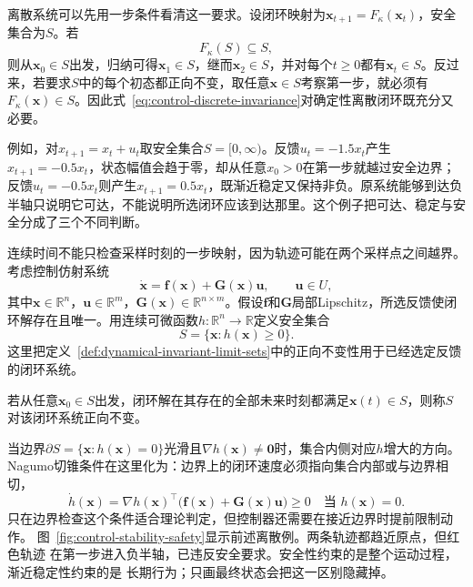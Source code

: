离散系统可以先用一步条件看清这一要求。设闭环映射为$\bm{x}_{t+1}=F_{\kappa}(\bm{x}_t)$，安全集合为$S$。若
\begin{equation}
  F_{\kappa}(S)\subseteq S,
  \label{eq:control-discrete-invariance}
\end{equation}
则从$\bm{x}_0\in S$出发，归纳可得$\bm{x}_1\in S$，继而$\bm{x}_2\in S$，并对每个$t\geq0$都有$\bm{x}_t\in S$。反过来，若要求$S$中的每个初态都正向不变，取任意$\bm{x}\in S$考察第一步，就必须有$F_{\kappa}(\bm{x})\in S$。因此式~\eqref{eq:control-discrete-invariance}对确定性离散闭环既充分又必要。

例如，对$x_{t+1}=x_t+u_t$取安全集合$S=[0,\infty)$。反馈$u_t=-1.5x_t$产生$x_{t+1}=-0.5x_t$，状态幅值会趋于零，却从任意$x_0>0$在第一步就越过安全边界；反馈$u_t=-0.5x_t$则产生$x_{t+1}=0.5x_t$，既渐近稳定又保持非负。原系统能够到达负半轴只说明它可达，不能说明所选闭环应该到达那里。这个例子把可达、稳定与安全分成了三个不同判断。

连续时间不能只检查采样时刻的一步映射，因为轨迹可能在两个采样点之间越界。考虑控制仿射系统
\begin{equation}
  \dot{\bm{x}}
  =
  \bm{f}(\bm{x})+\bm{G}(\bm{x})\bm{u},
  \qquad
  \bm{u}\in U,
  \label{eq:control-affine-system}
\end{equation}
其中$\bm{x}\in\mathbb{R}^n$，$\bm{u}\in\mathbb{R}^m$，$\bm{G}(\bm{x})\in\mathbb{R}^{n\times m}$。假设$\bm{f}$和$\bm{G}$局部Lipschitz，所选反馈使闭环解存在且唯一。用连续可微函数$h:\mathbb{R}^n\to\mathbb{R}$定义安全集合
\begin{equation}
  S
  =
  \{\bm{x}:h(\bm{x})\geq0\}.
  \label{eq:control-safe-set}
\end{equation}
这里把定义~\ref{def:dynamical-invariant-limit-sets}中的正向不变性用于已经选定反馈的闭环系统。
\begin{definition}[正向不变集]
\label{def:control-forward-invariance}
若从任意$\bm{x}_0\in S$出发，闭环解在其存在的全部未来时刻都满足$\bm{x}(t)\in S$，则称$S$对该闭环系统正向不变。
\end{definition}
当边界$\partial S=\{\bm{x}:h(\bm{x})=0\}$光滑且$\nabla h(\bm{x})\neq\bm{0}$时，集合内侧对应$h$增大的方向。Nagumo切锥条件在这里化为：边界上的闭环速度必须指向集合内部或与边界相切，
\begin{equation}
  \dot h(\bm{x})
  =
  \nabla h(\bm{x})^{\top}
  \bigl(
    \bm{f}(\bm{x})+\bm{G}(\bm{x})\bm{u}
  \bigr)
  \geq0
  \quad
  \text{当 }h(\bm{x})=0.
  \label{eq:control-nagumo-boundary}
\end{equation}
只在边界检查这个条件适合理论判定，但控制器还需要在接近边界时提前限制动作。
图~\ref{fig:control-stability-safety}显示前述离散例。两条轨迹都趋近原点，但红色轨迹
在第一步进入负半轴，已违反安全要求。安全性约束的是整个运动过程，渐近稳定性约束的是
长期行为；只画最终状态会把这一区别隐藏掉。

